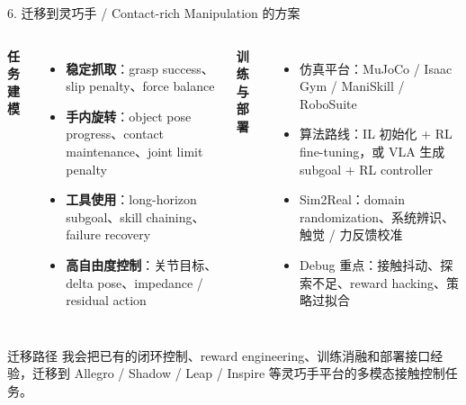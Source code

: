 \documentclass[UTF8,aspectratio=169,11pt]{ctexbeamer}
\begin{document}
\begin{frame}[shrink=8]{6. 迁移到灵巧手 / Contact-rich Manipulation 的方案}

    \begin{columns}[T]
        \textbf{任务建模}
        \begin{itemize}
            \item \textbf{稳定抓取}：grasp success、slip penalty、force balance
            \item \textbf{手内旋转}：object pose progress、contact maintenance、joint limit penalty
            \item \textbf{工具使用}：long-horizon subgoal、skill chaining、failure recovery
            \item \textbf{高自由度控制}：关节目标、delta pose、impedance / residual action
        \end{itemize}

        \textbf{训练与部署}
        \begin{itemize}
            \item 仿真平台：MuJoCo / Isaac Gym / ManiSkill / RoboSuite
            \item 算法路线：IL 初始化 + RL fine-tuning，或 VLA 生成 subgoal + RL controller
            \item Sim2Real：domain randomization、系统辨识、触觉 / 力反馈校准
            \item Debug 重点：接触抖动、探索不足、reward hacking、策略过拟合
        \end{itemize}
    \end{columns}

    \vspace{2mm}
    \begin{exampleblock}{迁移路径}
        我会把已有的闭环控制、reward engineering、训练消融和部署接口经验，迁移到 Allegro / Shadow / Leap / Inspire 等灵巧手平台的多模态接触控制任务。
    \end{exampleblock}
\end{frame}
\end{document}
